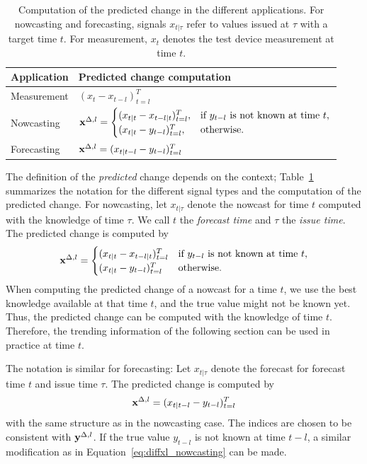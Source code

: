 \begin{table}
    \centering
    \scriptsize
    \begin{tabularx}{0.75\textwidth}{l X}
        \toprule
        Application & Predicted change computation \\
        \midrule
        Measurement & $(x_{t} - x_{t-l})_{t=l}^T $\\
        Nowcasting & $
\mathbf{x}^{\Delta,l} =
\begin{cases}
(x_{t|t} - x_{t-l|t})^T_{t=l}, & \text{if } y_{t-l} \text{ is not known at time } t, \\
(x_{t|t} - y_{t-l})^T_{t=l}, & \text{otherwise}.
\end{cases} 
$ \\
        Forecasting & $ \mathbf{x}^{\Delta,l} = (x_{t|t-l} - y_{t-l})^T_{t=l}$\\
        \bottomrule
    \end{tabularx}
    \caption{Computation of the predicted change in the different applications. For nowcasting and forecasting, signals $x_{t | \tau}$ refer to values issued at $\tau$ with a target time $t$. For measurement, $x_t$ denotes the test device measurement at time $t$.}
    \label{tab:notation}
\end{table}


The definition of the \textit{predicted} change depends on the context;
Table~\ref{tab:notation} summarizes the notation for the different signal types and the computation of the predicted change.
For nowcasting, let $x_{t | \tau}$ denote the nowcast for time $t$ computed with the knowledge of time $\tau$. 
We call $t$ the \textit{forecast time} and $\tau$ the \textit{issue time}.
The predicted change is computed by
\begin{equation}
  \mathbf{x}^{\Delta,l} =
\begin{cases}
(x_{t|t} - x_{t-l|t})^T_{t=l} & \text{if } y_{t-l} \text{ is not known at time } t, \\
(x_{t|t} - y_{t-l})^T_{t=l} & \text{otherwise}.
\end{cases} \label{eq:diffxl_nowcasting}
\end{equation}
When computing the predicted change of a nowcast for a time $t$, we use the best knowledge available at that time $t$, and the true value might not be known yet. 
Thus, the predicted change can be computed with the knowledge of time $t$. Therefore, the trending information of the following section can be used in practice at time $t$.

The notation is similar for forecasting: Let $x_{t | \tau}$ denote the forecast for forecast time $t$ and issue time $\tau$. 
The predicted change is computed by 
\begin{equation} \mathbf{x}^{\Delta,l} = (x_{t|t-l} - y_{t-l})^T_{t=l}\label{eq:diffxl_forecasting}
\end{equation}
with the same structure as in the nowcasting case. 
The indices are chosen to be consistent with $\mathbf{y}^{\Delta,l}$. 
If the true value $y_{t-l}$ is not known at time $t-l$, a similar modification as in Equation~\eqref{eq:diffxl_nowcasting} can be made.


